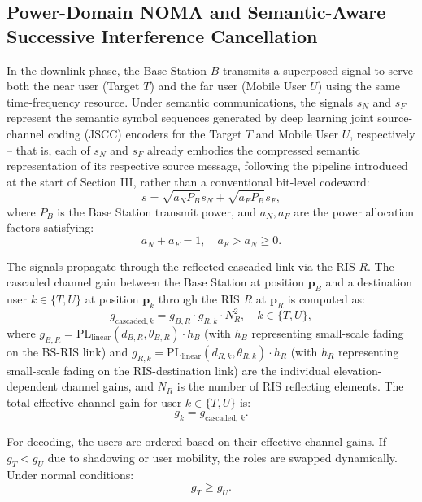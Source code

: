 \documentclass[journal,onecolumn]{IEEEtran}
\begin{document}
\subsection{Power-Domain NOMA and Semantic-Aware Successive Interference Cancellation}
In the downlink phase, the Base Station $B$ transmits a superposed signal to serve both the near user (Target $T$) and the far user (Mobile User $U$) using the same time-frequency resource. Under semantic communications, the signals $s_N$ and $s_F$ represent the semantic symbol sequences generated by deep learning joint source-channel coding (JSCC) encoders for the Target $T$ and Mobile User $U$, respectively -- that is, each of $s_N$ and $s_F$ already embodies the compressed semantic representation of its respective source message, following the pipeline introduced at the start of Section III, rather than a conventional bit-level codeword:
\begin{equation}
    s = \sqrt{a_N P_B} s_N + \sqrt{a_F P_B} s_F,
\end{equation}
where $P_B$ is the Base Station transmit power, and $a_N, a_F$ are the power allocation factors satisfying:
\begin{equation}
    a_N + a_F = 1, \quad a_F > a_N \ge 0.
\end{equation}

The signals propagate through the reflected cascaded link via the RIS $R$. The cascaded channel gain between the Base Station at position $\mathbf{p}_B$ and a destination user $k \in \{T, U\}$ at position $\mathbf{p}_k$ through the RIS $R$ at $\mathbf{p}_R$ is computed as:
\begin{equation}
    g_{\text{cascaded}, k} = g_{B, R} \cdot g_{R, k} \cdot N_R^2, \quad k \in \{T, U\},
\end{equation}
where $g_{B, R} = \text{PL}_{\text{linear}}(d_{B, R}, \theta_{B, R}) \cdot h_B$ (with $h_B$ representing small-scale fading on the BS-RIS link) and $g_{R, k} = \text{PL}_{\text{linear}}(d_{R, k}, \theta_{R, k}) \cdot h_R$ (with $h_R$ representing small-scale fading on the RIS-destination link) are the individual elevation-dependent channel gains, and $N_R$ is the number of RIS reflecting elements. The total effective channel gain for user $k \in \{T, U\}$ is:
\begin{equation}
    g_k = g_{\text{cascaded, } k}.
\end{equation}

For decoding, the users are ordered based on their effective channel gains. If $g_T < g_U$ due to shadowing or user mobility, the roles are swapped dynamically. Under normal conditions:
\begin{equation}
    g_T \ge g_U.
\end{equation}
\end{document}
